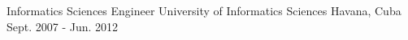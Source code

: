 


\begin{cventries}


\cventry
{Informatics Sciences Engineer} %
{University of Informatics Sciences} %
{Havana, Cuba} %
{Sept. 2007 - Jun. 2012} %
{ %
}


\end{cventries}
